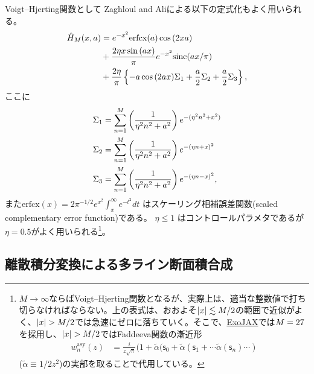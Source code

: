 Voigt--Hjerting関数として Zaghloul and Ali\cite{2011arXiv1106.0151Z}による以下の定式化もよく用いられる。
\begin{align}
\label{eq:algo916}
\hat{H}_{M}(x,a) &= e^{-x^2} \mathrm{erfcx} (a) \cos{(2 x a)} \nonumber \\
&+ \frac{2 \eta x \sin{(a x)}}{\pi}  e^{-x^2} \mathrm{sinc} (a x/\pi) \nonumber \\
&+ \frac{2 \eta}{\pi} \left\{  - a \cos{(2 a x)} \Sigma_1 + \frac{a}{2} \Sigma_2 + \frac{a}{2} \Sigma_3 \right\},
\end{align}
ここに
\begin{align}
\Sigma_1 &= \sum_{n=1}^{M} \left( \frac{1}{\eta^2 n^2 + a^2}\right) e^{-(\eta^2 n^2 + x^2)}  \\
\Sigma_2 &= \sum_{n=1}^{M} \left( \frac{1}{\eta^2 n^2 + a^2}\right) e^{-(\eta n + x)^2}  \\
\Sigma_3 &= \sum_{n=1}^{M} \left( \frac{1}{\eta^2 n^2 + a^2}\right) e^{-(\eta n - x)^2}, 
\end{align}
また$\mathrm{erfcx} (x) = 2 \pi^{-1/2} e^{x^2} \int_x^\infty e^{-t^2} dt $ はスケーリング相補誤差関数(scaled complementary error function)である。  $\eta \le 1$ はコントロールパラメタであるが$\eta=0.5$がよく用いられる\footnote{$M \to \infty$ならばVoigt--Hjerting関数となるが、実際上は、適当な整数値で打ち切らなければならない。上の表式は、おおよそ$|x| \lesssim M/2$の範囲で近似がよく、$|x| > M/2$では急速にゼロに落ちていく。そこで、\href{https://github.com/HajimeKawahara/exojax}{\sf ExoJAX}では$M=27$を採用し、$|x|>\Ncut/2$ではFaddeeva関数の漸近形
\begin{align}
\label{eq:asywofz}
  w_n^\mathrm{asy}(z) &= \frac{i}{z \sqrt{\pi}} ( 1 + \tilde{\alpha} ( \mathsf{s}_0 + \tilde{\alpha} ( \mathsf{s}_1 +  \cdots \tilde{\alpha}  ( \mathsf{s}_n )\cdots) 
\end{align}
($\tilde{\alpha} \equiv {1}/{2 z^2}$)の実部を取ることで代用している。}。

\subsection*{離散積分変換による多ライン断面積合成}

